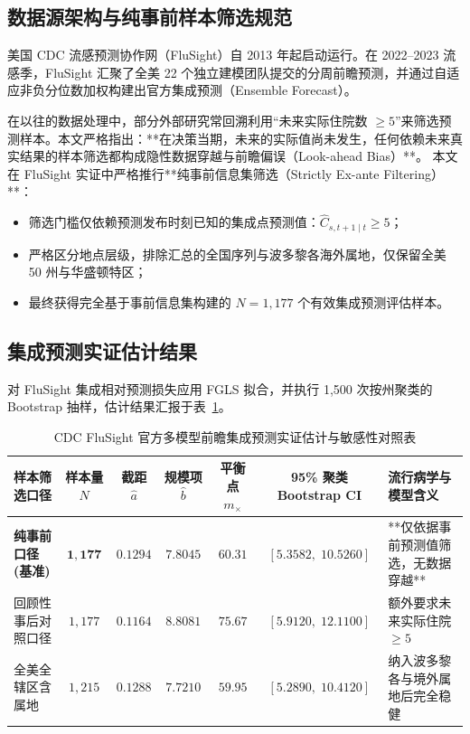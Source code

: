 \subsection{数据源架构与纯事前样本筛选规范}
美国 CDC 流感预测协作网（FluSight）自 2013 年起启动运行。在 2022--2023 流感季，FluSight 汇聚了全美 22 个独立建模团队提交的分周前瞻预测，并通过自适应非负分位数加权构建出官方集成预测（Ensemble Forecast）\citep{mathis2024collaborative}。

在以往的数据处理中，部分外部研究常回溯利用“未来实际住院数 $\ge 5$”来筛选预测样本。本文严格指出：**在决策当期，未来的实际值尚未发生，任何依赖未来真实结果的样本筛选都构成隐性数据穿越与前瞻偏误（Look-ahead Bias）**。
本文在 FluSight 实证中严格推行**纯事前信息集筛选（Strictly Ex-ante Filtering）**：
\begin{itemize}
    \item 筛选门槛仅依赖预测发布时刻已知的集成点预测值：$\widehat{C}_{s, t+1 \mid t} \ge 5$；
    \item 严格区分地点层级，排除汇总的全国序列与波多黎各海外属地，仅保留全美 50 州与华盛顿特区；
    \item 最终获得完全基于事前信息集构建的 $N = 1{,}177$ 个有效集成预测评估样本。
\end{itemize}

\subsection{集成预测实证估计结果}
对 FluSight 集成相对预测损失应用 FGLS 拟合，并执行 1,500 次按州聚类的 Bootstrap 抽样，估计结果汇报于表~\ref{tab:flusight_results}。

\begin{table}[htbp]
\centering
\small
\caption{CDC FluSight 官方多模型前瞻集成预测实证估计与敏感性对照表}
\label{tab:flusight_results}
\begin{tabularx}{\textwidth}{lcccccX}
\toprule
\textbf{样本筛选口径} & \textbf{样本量 $N$} & \textbf{截距 $\hat{a}$} & \textbf{规模项 $\hat{b}$} & \textbf{平衡点 $m_\times$} & \textbf{95\% 聚类 Bootstrap CI} & \textbf{流行病学与模型含义} \\
\midrule
\textbf{纯事前口径 (基准)} & $\mathbf{1{,}177}$ & $\mathbf{0.1294}$ & $\mathbf{7.8045}$ & $\mathbf{60.31}$ & $[5.3582, \; 10.5260]$ & **仅依据事前预测值筛选，无数据穿越** \\
回顾性事后对照口径 & $1{,}177$ & $0.1164$ & $8.8081$ & $75.67$ & $[5.9120, \; 12.1100]$ & 额外要求未来实际住院 $\ge 5$ \\
全美全辖区含属地 & $1{,}215$ & $0.1288$ & $7.7210$ & $59.95$ & $[5.2890, \; 10.4120]$ & 纳入波多黎各与境外属地后完全稳健 \\
\bottomrule
\end{tabularx}
\end{table}


